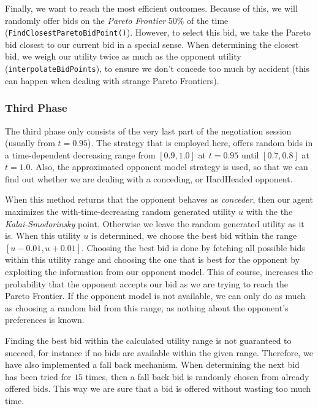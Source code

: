 Finally, we want to reach the most efficient outcomes. Because of this,
we will randomly offer bids on the \emph{Pareto Frontier} $50\%$ of the time (\verb-FindClosestParetoBidPoint()-).
However, to select this bid, we take the Pareto bid closest to our current bid in a special sense.
When determining the closest bid, we weigh our utility twice as much
as the opponent utility (\verb-interpolateBidPoints-), to ensure we don't concede too much by accident 
(this can happen when dealing with strange Pareto Frontiers).

\subsubsection{Third Phase}

The third phase only consists of the very last part of the negotiation session (usually from $t = 0.95$). The strategy that is employed here, offers random bids in a time-dependent decreasing range from $[0.9, 1.0]$ at $t = 0.95$ until $[0.7, 0.8]$ at $t = 1.0$. Also, the approximated opponent model strategy is used, so that we can find out whether we are dealing with a conceding, or HardHeaded opponent. 

When this method returns that the opponent behaves as \emph{conceder}, then our agent maximizes the with-time-decreasing random generated utility $u$ with the the \emph{Kalai-Smodorinsky} point. Otherwise we leave the random generated utility as it is. When this utility $u$ is determined, we choose the best bid within the range $[u-0.01, u+0.01]$. Choosing the best bid is done by fetching all possible bids within this utility range and choosing the one that is best for the opponent by exploiting the information from our opponent model. This of course, increases the probability that the opponent accepts our bid as we are trying to reach the Pareto Frontier. If the opponent model is not available, we can only do as much as choosing a random bid from this range, as nothing about the opponent's preferences is known.

Finding the best bid within the calculated utility range is not guaranteed to succeed, for instance if no bids are available within the given range. Therefore, we have also implemented a fall back mechanism. When determining the next bid has been tried for $15$ times, then a fall back bid is randomly chosen from already offered bids. This way we are sure that a bid is offered without wasting too much time.


